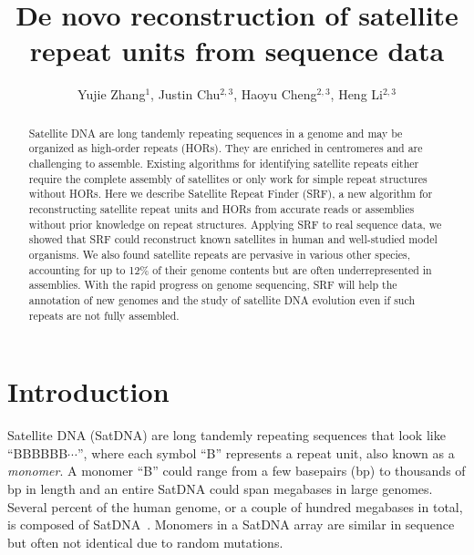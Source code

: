 \documentclass{bioinfo}
\begin{document}

\title[Satellite repeat finder]{De novo reconstruction of satellite repeat units from sequence data}
\author[Li]{Yujie Zhang$^1$, Justin Chu$^{2,3}$, Haoyu Cheng$^{2,3}$, Heng Li$^{2,3}$}
\address{$^1$Harvard School of Public Health, 677 Huntington Avenue, Boston, MA 02115, USA,
$^2$Department of Data Science, Dana-Farber Cancer Institute, 450 Brookline Ave, Boston, MA 02215, USA,
$^3$Department of Biomedical Informatics, Harvard Medical School, 10 Shattuck St, Boston, MA 02115, USA}

\maketitle

\begin{abstract}
Satellite DNA are long tandemly repeating sequences in a genome and may be organized as
high-order repeats (HORs). They are enriched in centromeres and are
challenging to assemble. Existing algorithms for identifying satellite repeats
either require the complete assembly of satellites or only work for simple
repeat structures without HORs. Here we describe Satellite Repeat Finder (SRF), a new
algorithm for reconstructing satellite repeat units and HORs from
accurate reads or assemblies without prior knowledge on repeat structures.
Applying SRF to real sequence data, we showed that SRF could reconstruct known
satellites in human and well-studied model organisms. We also found satellite
repeats are pervasive in various other species, accounting for up to 12\% of
their genome contents but are often underrepresented in assemblies. With the
rapid progress on genome sequencing, SRF will help the annotation of new
genomes and the study of satellite DNA evolution even if such repeats are not
fully assembled.
\end{abstract}

\section{Introduction}

Satellite DNA (SatDNA) are long tandemly repeating sequences that look like
``{\sf BBBBBB$\cdots$}'', where each symbol ``{\sf B}'' represents a
repeat unit, also known as a \emph{monomer}. A monomer ``{\sf B}'' could range
from a few basepairs (bp) to thousands of bp in length and an entire SatDNA could span
megabases in large genomes. Several percent of the human genome, or a couple of
hundred megabases in total, is composed of SatDNA~\citep{Altemose:2022tv}.
Monomers in a SatDNA array are similar in sequence but often not identical due
to random mutations.
\end{document}
